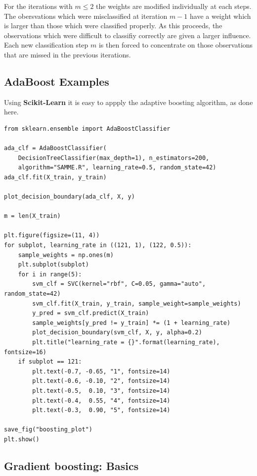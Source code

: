 \documentclass[%
oneside,                 %
final,                   %
10pt]{article}
\begin{document}
\noindent
For the iterations with $m \le 2$ the weights are modified
individually at each steps. The obersvations which were misclassified
at iteration $m-1$ have a weight which is larger than those which were
classified properly. As this proceeds, the observations which were
difficult to classifiy correctly are given a larger influence. Each
new classification step $m$ is then forced to concentrate on those
observations that are missed in the previous iterations.



\subsection*{AdaBoost Examples}

Using \textbf{Scikit-Learn} it is easy to appply the adaptive boosting algorithm, as done here.

\begin{verbatim}
from sklearn.ensemble import AdaBoostClassifier

ada_clf = AdaBoostClassifier(
    DecisionTreeClassifier(max_depth=1), n_estimators=200,
    algorithm="SAMME.R", learning_rate=0.5, random_state=42)
ada_clf.fit(X_train, y_train)

plot_decision_boundary(ada_clf, X, y)

m = len(X_train)

plt.figure(figsize=(11, 4))
for subplot, learning_rate in ((121, 1), (122, 0.5)):
    sample_weights = np.ones(m)
    plt.subplot(subplot)
    for i in range(5):
        svm_clf = SVC(kernel="rbf", C=0.05, gamma="auto", random_state=42)
        svm_clf.fit(X_train, y_train, sample_weight=sample_weights)
        y_pred = svm_clf.predict(X_train)
        sample_weights[y_pred != y_train] *= (1 + learning_rate)
        plot_decision_boundary(svm_clf, X, y, alpha=0.2)
        plt.title("learning_rate = {}".format(learning_rate), fontsize=16)
    if subplot == 121:
        plt.text(-0.7, -0.65, "1", fontsize=14)
        plt.text(-0.6, -0.10, "2", fontsize=14)
        plt.text(-0.5,  0.10, "3", fontsize=14)
        plt.text(-0.4,  0.55, "4", fontsize=14)
        plt.text(-0.3,  0.90, "5", fontsize=14)

save_fig("boosting_plot")
plt.show()
\end{verbatim}


\subsection*{Gradient boosting: Basics}
\end{document}
